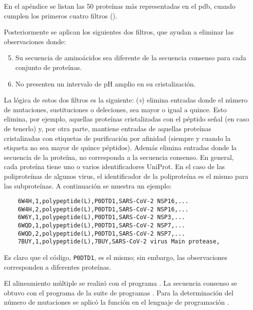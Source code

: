 En el apéndice se listan las 50 proteínas más representadas en el \acrshort{pdb}, cuando cumplen los primeros cuatro filtros (). 

Posteriormente se aplican los siguientes dos filtros, que ayudan a eliminar las observaciones donde:

\begin{enumerate}
	\setcounter{enumi}{4}
	\item Su secuencia de aminoácidos sea diferente de la secuencia consenso para cada conjunto de proteínas.
	\item No presenten un intervalo de pH amplio en su cristalización.
\end{enumerate}

La lógica de estos dos filtros es la siguiente: (\emph{v}) elimina entradas donde el número de mutaciones, sustituciones o deleciones, sea mayor o igual a quince. Esto elimina, por ejemplo, aquellas proteínas cristalizadas con el péptido señal (en caso de tenerlo) y, por otra parte, mantiene entradas de aquellas proteínas cristalizadas con etiquetas de purificación por afinidad (siempre y cuando la etiqueta no sea mayor de quince péptidos).  Además elimina entradas donde la secuencia de la proteína, no corresponda a la secuencia consenso. En general, cada proteína tiene uno o varios identificadores UniProt. En el caso de las poliproteínas de algunos virus, el identificador de la poliproteína es el mismo para las subproteínas. A continuación se muestra un ejemplo:

\begin{kaobox}[frametitle=Ejemplo 2]
	\begin{verbatim}
	6W4H,1,polypeptide(L),P0DTD1,SARS-CoV-2 NSP16,...
	6W4H,2,polypeptide(L),P0DTD1,SARS-CoV-2 NSP16,...
	6W6Y,1,polypeptide(L),P0DTD1,SARS-CoV-2 NSP3,...
	6WQD,1,polypeptide(L),P0DTD1,SARS-CoV-2 NSP7,...
	6WQD,2,polypeptide(L),P0DTD1,SARS-CoV-2 NSP7,...
	7BUY,1,polypeptide(L),7BUY,SARS-CoV-2 virus Main protease,
	\end{verbatim}
\end{kaobox}


Es claro que el código, \texttt{P0DTD1}, es el mismo; sin embargo, las observaciones corresponden a diferentes proteínas.

El alineamiento múltiple se realizó con el programa  . La secuencia consenso se obtuvo con el programa  de la suite de programas  . Para la determinación del número de mutaciones se aplicó la función   en el lenguaje de programación . 

